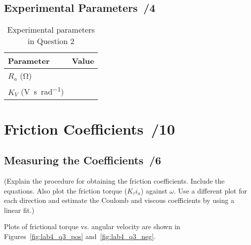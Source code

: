 \documentclass{article}
\newcommand{\score}{\hfill \underline{\hspace{0.65cm}}\,/} %
\begin{document}
\subsection{Experimental Parameters \score 4}
\begin{table}[phtb] 
\begin{center}
\caption{Experimental parameters in Question 2}
\label{tbl:lab4_q2_2}
\begin{tabular}{l|r} \hline \hline
\cellcolor{lightgray} Parameter & \cellcolor{lightgray} Value \\
\hline
$R_a$ (\si{\ohm}) &  \\ \hline
$K_V$ (\si{\volt\second\per\radian}) &  \\ \hline
\end{tabular}
\end{center}
\end{table}

\section{Friction Coefficients \score 10}
\subsection{Measuring the Coefficients \score 6}
(Explain the procedure for obtaining the friction coefficients. Include the equations. Also plot the friction torque ($K_{\tau}i_a$) against $\omega$. Use a different plot for each direction and estimate the Coulomb and viscous coefficients by using a linear fit.) 

Plots of frictional torque vs. angular velocity are shown in Figures~\ref{fig:lab4_q3_pos} and~\ref{fig:lab4_q3_neg}.
 
\end{document}
